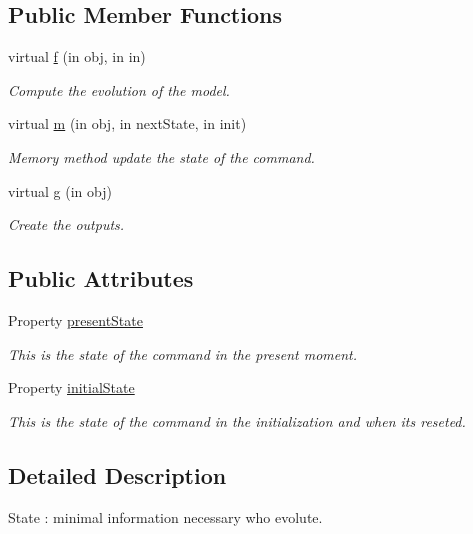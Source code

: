 \subsection*{Public Member Functions}
\begin{DoxyCompactItemize}
\item 
virtual \hyperlink{class_model_s_e_d_ac36f9451c43b120828af4380858f2024}{f} (in obj, in in)
\begin{DoxyCompactList}\small\item\em Compute the evolution of the model. \end{DoxyCompactList}\item 
virtual \hyperlink{class_model_s_e_d_adb8aaccb857cf5bbec640cd00915459d}{m} (in obj, in next\+State, in init)
\begin{DoxyCompactList}\small\item\em Memory method update the state of the command. \end{DoxyCompactList}\item 
virtual \hyperlink{class_model_s_e_d_ac6bf71081e35755d5ed9992d165afcb8}{g} (in obj)
\begin{DoxyCompactList}\small\item\em Create the outputs. \end{DoxyCompactList}\end{DoxyCompactItemize}
\subsection*{Public Attributes}
\begin{DoxyCompactItemize}
\item 
Property \hyperlink{class_model_s_e_d_a9624cc7c421a50fa5086b0ebd0cd5fe3}{present\+State}
\begin{DoxyCompactList}\small\item\em This is the state of the command in the present moment. \end{DoxyCompactList}\item 
Property \hyperlink{class_model_s_e_d_acd9263acfa96c9138afdf497e55acc24}{initial\+State}
\begin{DoxyCompactList}\small\item\em This is the state of the command in the initialization and when it\textquotesingle{}s reseted. \end{DoxyCompactList}\end{DoxyCompactItemize}


\subsection{Detailed Description}
State \+: minimal information necessary who evolute. 

